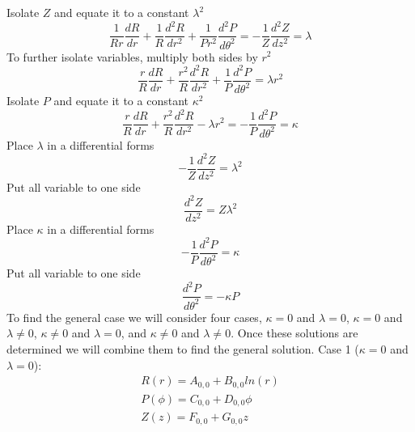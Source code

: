 \documentclass[12pt]{article}
\begin{document}
    Isolate $Z$ and equate it to a constant $\lambda^2$
    \begin{equation} \label{eq: 1-7}
        \frac{1}{Rr} \frac{dR}{dr} + \frac{1}{R}\frac{d^2 R}{d r^2} + \frac{1}{P r^2} \frac{d^2 P}{d \theta^2} = -\frac{1}{Z} \frac{d^2 Z}{d z^2} = \lambda
    \end{equation}
    To further isolate variables, multiply both sides by $r^2$
    \begin{equation} \label{eq: 1-8}
        \frac{r}{R} \frac{dR}{dr} + \frac{r^2}{R}\frac{d^2 R}{d r^2} + \frac{1}{P} \frac{d^2 P}{d \theta^2} = \lambda r^2
    \end{equation}
    Isolate $P$ and equate it to a constant $\kappa^2$
    \begin{equation} \label{eq: 1-9}
        \frac{r}{R} \frac{dR}{dr} + \frac{r^2}{R}\frac{d^2 R}{d r^2} - \lambda r^2 = - \frac{1}{P} \frac{d^2 P}{d \theta^2} = \kappa
    \end{equation}
    Place $\lambda$ in a differential forms
    \begin{equation} \label{eq: 1-10}
        -\frac{1}{Z} \frac{d^2 Z}{d z^2} = \lambda^2
    \end{equation}
    Put all variable to one side
    \begin{equation} \label{eq: 1-11}
        \frac{d^2 Z}{d z^2} = Z\lambda^2
    \end{equation}
    Place $\kappa$ in a differential forms
    \begin{equation} \label{eq: 1-12}
        - \frac{1}{P} \frac{d^2 P}{d \theta^2} = \kappa
    \end{equation}
    Put all variable to one side
    \begin{equation} \label{eq: 1-13}
        \frac{d^2 P}{d \theta^2}  = - \kappa P
    \end{equation}
    To find the general case we will consider four cases, $\kappa=0$ and $\lambda=0$, $\kappa=0$ and $\lambda \neq 0$,  $\kappa \neq 0$ and $\lambda=0$, and  $\kappa \neq 0$ and $\lambda \neq 0$. Once these solutions are determined we will combine them to find the general solution. 
    \newline Case 1 ($\kappa=0$ and $\lambda=0$):
    \begin{equation} \label{eq: 1-14}
        \begin{split}
            R(r) = A_{0,0} + B_{0,0} ln(r)
            \\ P(\phi) = C_{0,0} + D_{0,0}\phi
            \\ Z(z) = F_{0,0} + G_{0,0}z
        \end{split}
    \end{equation}
\end{document}
